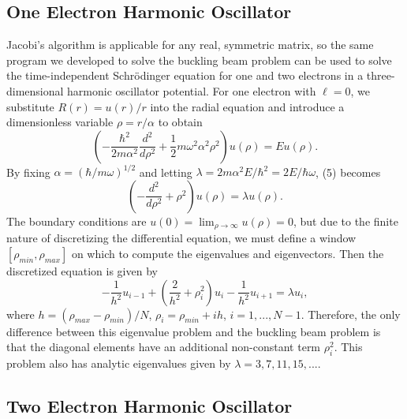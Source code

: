 \documentclass[prb,aps,twocolumn,showpacs,10pt]{revtex4-1}
\begin{document}
\subsection{One Electron Harmonic Oscillator}
Jacobi's algorithm is applicable for any real, symmetric matrix, so the same program we developed to solve the buckling beam problem can be used to solve the time-independent Schr{\"o}dinger equation for one and two electrons in a three-dimensional harmonic oscillator potential. For one electron with $\ell=0$, we substitute $R(r)=u(r)/r$ into the radial equation and introduce a dimensionless variable $\rho = r/\alpha$ to obtain
\begin{equation}
\left( -\frac{\hbar^2}{2m\alpha^2} \frac{d^2}{d\rho^2} + \frac{1}{2}m\omega^2\alpha^2\rho^2 \right) u(\rho) = E u(\rho). 
\end{equation}
By fixing $\alpha=(\hbar/m\omega)^{1/2}$ and letting $\lambda=2m\alpha^2 E/\hbar^2 = 2E/\hbar\omega$\cite{notes}, (5) becomes 
\begin{equation}
\left( -\frac{d^2}{d\rho^2} + \rho^2 \right) u(\rho) = \lambda u(\rho).
\end{equation}
The boundary conditions are $u(0)=\lim_{\rho \rightarrow \infty} u(\rho)=0$, but due to the finite nature of discretizing the differential equation, we must define a window $[\rho_{min}, \rho_{max}]$ on which to compute the eigenvalues and eigenvectors. Then the discretized equation is given by
\begin{equation}
-\frac{1}{h^2} u_{i-1} + \left( \frac{2}{h^2} + \rho_i^2 \right) u_i -\frac{1}{h^2} u_{i+1} = \lambda u_i, 
\end{equation}
where $h=(\rho_{max}-\rho_{min})/N$, $\rho_i = \rho_{min} + ih$, $i = 1, ..., N-1$. Therefore, the only difference between this eigenvalue problem and the buckling beam problem is that the diagonal elements have an additional non-constant term $\rho_i^2$. This problem also has analytic eigenvalues given by $\lambda = 3, 7, 11, 15, ...$.

\subsection{Two Electron Harmonic Oscillator}
\end{document}

